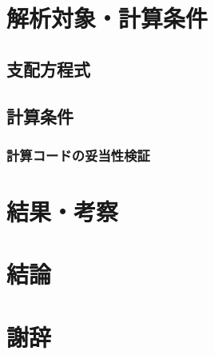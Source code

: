 \documentclass[
    paper=a4paper,      %
    article,            %
    fleqn,              %
    fontsize=10pt,      %
    jafontsize=10pt,    %
    head_space=20mm,    %
    foot_space=25mm,    %
    gutter=20mm,        %
    fore-edge=20mm      %
    ]{jlreq}            %
\begin{document}
\lipsum[1-4]

\section{解析対象・計算条件}


\subsection{支配方程式}

\subsection{計算条件}

\subsubsection{計算コードの妥当性検証}

\lipsum[1-4]


\section{結果・考察}

\lipsum[1-4]

\section{結論}


\section*{謝辞}

\lipsum[1-4]
\end{document}
